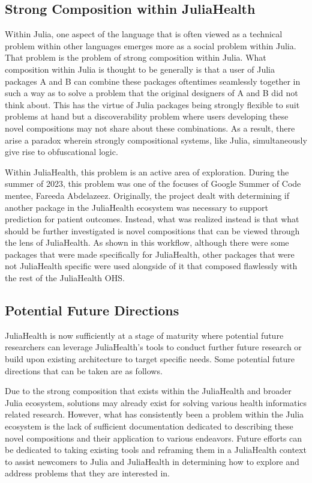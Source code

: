 \documentclass{juliacon}
\begin{document}
\subsection{Strong Composition within JuliaHealth}

Within Julia, one aspect of the language that is often viewed as a technical problem within other languages emerges more as a social problem within Julia.
That problem is the problem of strong composition within Julia.
What composition within Julia is thought to be generally is that a user of Julia packages A and B can combine these packages oftentimes seamlessly together in such a way as to solve a problem that the original designers of A and B did not think about.
This has the virtue of Julia packages being strongly flexible to suit problems at hand but a discoverability problem where users developing these novel compositions may not share about these combinations.
As a result, there arise a paradox wherein strongly compositional systems, like Julia, simultaneously give rise to obfuscational logic.

Within JuliaHealth, this problem is an active area of exploration.
During the summer of 2023, this problem was one of the focuses of Google Summer of Code mentee, Fareeda Abdelazeez.
Originally, the project dealt with determining if another package in the JuliaHealth ecosystem was necessary to support prediction for patient outcomes.
Instead, what was realized instead is that what should be further investigated is novel compositions that can be viewed through the lens of JuliaHealth.
As shown in this workflow, although there were some packages that were made specifically for JuliaHealth, other packages that were not JuliaHealth specific were used alongside of it that composed flawlessly with the rest of the JuliaHealth OHS.

\subsection{Potential Future Directions}

JuliaHealth is now sufficiently at a stage of maturity where potential future researchers can leverage JuliaHealth's tools to conduct further future research or build upon existing architecture to target specific needs.
Some potential future directions that can be taken are as follows.

Due to the strong composition that exists within the JuliaHealth and broader Julia ecosystem, solutions may already exist for solving various health informatics related research.
However, what has consistently been a problem within the Julia ecosystem is the lack of sufficient documentation dedicated to describing these novel compositions and their application to various endeavors.
Future efforts can be dedicated to taking existing tools and reframing them in a JuliaHealth context to assist newcomers to Julia and JuliaHealth in determining how to explore and address problems that they are interested in.
\end{document}
